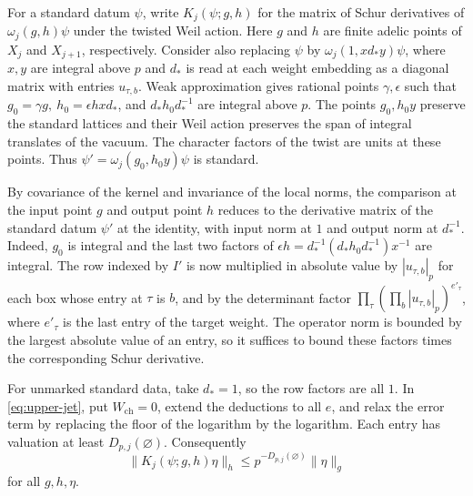 For a standard datum \(\psi\), write \(K_j(\psi;g,h)\) for the
matrix of Schur derivatives of \(\omega_j(g,h)\psi\) under the
twisted Weil action. Here \(g\) and \(h\) are finite adelic points
of \(X_j\) and \(X_{j+1}\), respectively.
Consider also replacing \(\psi\) by \(\omega_j(1,x d_\ast y)\psi\),
where \(x,y\) are integral above \(p\) and \(d_\ast\) is read at
each weight embedding as a diagonal matrix with entries \(u_{\tau,b}\).
Weak approximation gives rational points \(\gamma,\epsilon\) such
that \(g_0=\gamma g,\ h_0=\epsilon h x d_\ast\), and
\(d_\ast h_0 d_\ast^{-1}\) are integral above \(p\).
The points \(g_0,h_0 y\) preserve the standard lattices and their
Weil action preserves the span of integral translates of the vacuum.
The character factors of the twist are units at these points.
Thus \(\psi'=\omega_j(g_0,h_0 y)\psi\) is standard.

By covariance of the kernel and invariance of the local norms,
the comparison at the input point \(g\) and output point \(h\)
reduces to the derivative matrix of the standard datum \(\psi'\)
at the identity, with input norm at \(1\) and output norm at
\(d_\ast^{-1}\). Indeed, \(g_0\) is integral and the last two
factors of \(\epsilon h=d_\ast^{-1}(d_\ast h_0d_\ast^{-1})x^{-1}\)
are integral. The row indexed by \(I'\) is now multiplied in
absolute value by \(|u_{\tau,b}|_p\) for each box whose entry at
\(\tau\) is \(b\), and by the determinant factor
\(\prod_\tau(\prod_b|u_{\tau,b}|_p)^{e'_\tau}\), where \(e'_\tau\)
is the last entry of the target weight.
The operator norm is bounded by the largest absolute value of an
entry, so it suffices to bound these factors times the corresponding
Schur derivative.

For unmarked standard data, take \(d_\ast=1\), so the row factors
are all \(1\). In \eqref{eq:upper-jet}, put \(W_\mathrm{ch}=0\),
extend the deductions to all \(e\), and relax the error term by
replacing the floor of the logarithm by the logarithm.
Each entry has valuation at least \(D_{p,j}(\varnothing)\).
Consequently
\begin{equation}\label{eq:upper-kernel-gauge}
 \|K_j(\psi;g,h)\eta\|_h
 \le p^{-D_{p,j}(\varnothing)}\|\eta\|_g
\end{equation}
for all \(g,h,\eta\).

